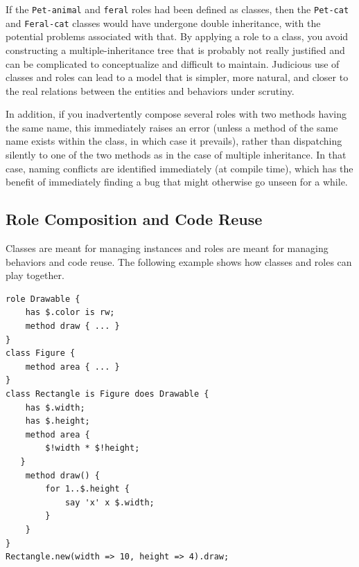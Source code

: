 If the {\tt Pet-animal} and {\tt feral} roles had been defined 
as classes, then the {\tt Pet-cat} and {\tt Feral-cat} classes 
would have undergone double inheritance, with the potential 
problems associated with that. By applying a role to a 
class, you avoid constructing a multiple-inheritance tree 
that is probably not really justified and can be complicated 
to conceptualize and difficult to maintain. Judicious use 
of classes and roles can lead to a model that is simpler, 
more natural, and closer to the real relations between the 
entities and behaviors under scrutiny.


In addition, if you inadvertently compose several roles with 
two methods having the same name, this immediately raises 
an error (unless a method of the same name exists within the 
class, in which case it prevails), rather than dispatching 
silently to one of the two methods as in the case of multiple 
inheritance. In that case, naming conflicts are identified 
immediately (at compile time), which has the benefit of 
immediately finding a bug that might otherwise go 
unseen for a while.

\subsection{Role Composition and Code Reuse}

Classes are meant for managing instances and roles are 
meant for managing behaviors and code reuse. The following 
example shows how classes and roles can play together.

\begin{verbatim}
role Drawable {
    has $.color is rw;
    method draw { ... }
}
class Figure {
    method area { ... }
}
class Rectangle is Figure does Drawable {
    has $.width;
    has $.height;
    method area {
        $!width * $!height;
   }
    method draw() {
        for 1..$.height {
            say 'x' x $.width;
        }
    }
}
Rectangle.new(width => 10, height => 4).draw;
\end{verbatim}

